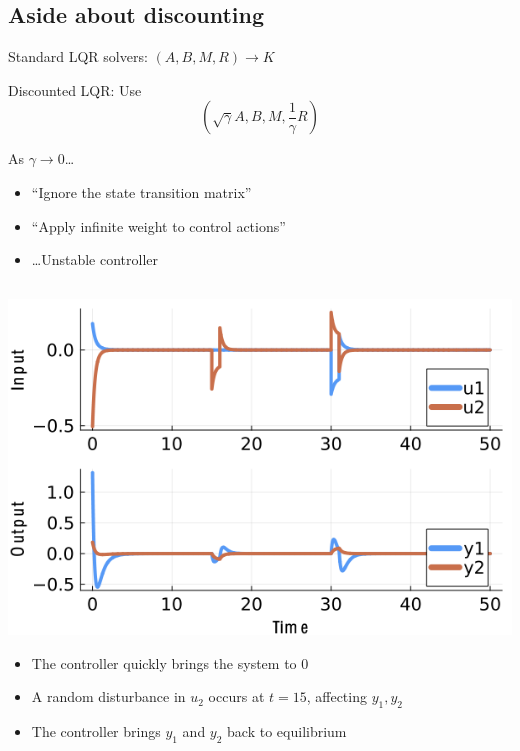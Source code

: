 \documentclass[
  letterpaper,
  DIV=11,
  numbers=noendperiod,
  oneside]{scrartcl}
\providecommand{\tightlist}{%
  \setlength{\itemsep}{0pt}\setlength{\parskip}{0pt}}\usepackage{longtable,booktabs,array}
\begin{document}
\subsection{Aside about discounting}\label{aside-about-discounting}

Standard LQR solvers: \((A, B, M, R) \to K\)

Discounted LQR: Use
\[\left( \sqrt{\gamma} A, B, M, \frac{1}{\gamma} R \right)\]

As \(\gamma \to 0\)\ldots{}

\begin{itemize}
\tightlist
\item
  ``Ignore the state transition matrix''
\item
  ``Apply infinite weight to control actions''
\item
  \ldots Unstable controller
\end{itemize}

\subsection{}\label{section-25}

\includegraphics{figs/lqr_disturbance.png}

\begin{itemize}
\tightlist
\item
  The controller quickly brings the system to \(0\)
\item
  A random disturbance in \(u_2\) occurs at \(t = 15\), affecting
  \(y_1, y_2\)
\item
  The controller brings \(y_1\) and \(y_2\) back to equilibrium
\end{itemize}
\end{document}
